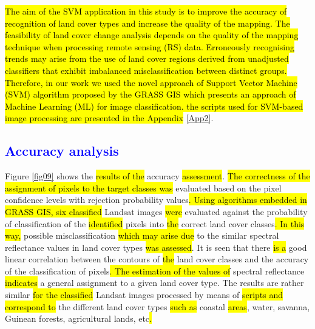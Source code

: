\documentclass[earth,article,submit,pdftex,moreauthors]{Definitions/mdpi}
\begin{document}
\hl{The aim of the SVM application in this study is to improve the accuracy of recognition of land cover types and increase the quality of the mapping. The feasibility of land cover change analysis depends on the quality of the mapping technique when processing remote sensing (RS) data. Erroneously recognising trends may arise from the use of land cover regions derived from unadjusted classifiers that exhibit imbalanced misclassification between distinct groups. Therefore, in our work we used the novel approach of Support Vector Machine (SVM) algorithm proposed by the GRASS GIS which presents an approach of Machine Learning (ML) for image classification. the scripts used for SVM-based image processing are presented in the Appendix} \ref{App2}.

\subsection{\textcolor{blue}{Accuracy analysis}}

Figure \ref{fig09} shows the \hl{results of the }accuracy \hl{assessment}. \hl{The correctness of the assignment of pixels to the target classes was }evaluated based on the pixel confidence levels with rejection probability values\hl{. Using algorithms embedded in GRASS GIS, six classified} Landsat images \hl{were }evaluated against the probability of classification of the\hl{ identified }pixels into \hl{the }correct land cover classes\hl{. In this way, }possible misclassification \hl{which may arise due} to the similar spectral reflectance values in land cover types \hl{was assessed}. It is seen that there \hl{is a} good linear correlation\hl{ }between the contours of \hl{the }land cover classes and the accuracy of the classification of pixels\hl{. The estimation of the values of }spectral reflectance \hl{indicates} a general assignment to a given land cover type. The results are rather similar \hl{for the classified } Landsat images processed by means of \hl{scripts and correspond to} the different land cover types \hl{such as }coastal \hl{areas}, water, savanna, Guinean forests, agricultural lands, etc\hl{.} 
\end{document}
